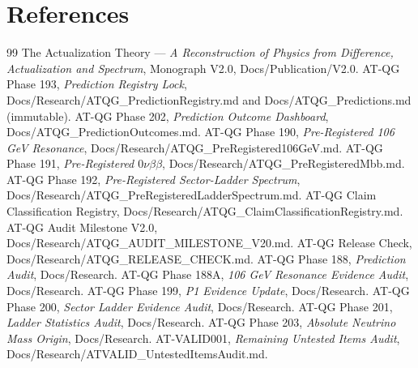 \documentclass[11pt,a4paper]{article}
\begin{document}
\section*{References}
\label{sec:references}

\begin{thebibliography}{99}
 The Actualization Theory --- \emph{A Reconstruction of Physics from
Difference, Actualization and Spectrum}, Monograph V2.0, Docs/Publication/V2.0.
 AT-QG Phase 193, \emph{Prediction Registry Lock},
Docs/Research/ATQG\_PredictionRegistry.md and Docs/ATQG\_Predictions.md (immutable).
 AT-QG Phase 202, \emph{Prediction Outcome Dashboard},
Docs/ATQG\_PredictionOutcomes.md.
 AT-QG Phase 190, \emph{Pre-Registered 106 GeV Resonance},
Docs/Research/ATQG\_PreRegistered106GeV.md.
 AT-QG Phase 191, \emph{Pre-Registered $0\nu\beta\beta$},
Docs/Research/ATQG\_PreRegisteredMbb.md.
 AT-QG Phase 192, \emph{Pre-Registered Sector-Ladder Spectrum},
Docs/Research/ATQG\_PreRegisteredLadderSpectrum.md.
 AT-QG Claim Classification Registry, Docs/Research/ATQG\_ClaimClassificationRegistry.md.
 AT-QG Audit Milestone V2.0, Docs/Research/ATQG\_AUDIT\_MILESTONE\_V20.md.
 AT-QG Release Check, Docs/Research/ATQG\_RELEASE\_CHECK.md.
 AT-QG Phase 188, \emph{Prediction Audit}, Docs/Research.
 AT-QG Phase 188A, \emph{106 GeV Resonance Evidence Audit}, Docs/Research.
 AT-QG Phase 199, \emph{P1 Evidence Update}, Docs/Research.
 AT-QG Phase 200, \emph{Sector Ladder Evidence Audit}, Docs/Research.
 AT-QG Phase 201, \emph{Ladder Statistics Audit}, Docs/Research.
 AT-QG Phase 203, \emph{Absolute Neutrino Mass Origin}, Docs/Research.
 AT-VALID001, \emph{Remaining Untested Items Audit}, Docs/Research/ATVALID\_UntestedItemsAudit.md.
\end{thebibliography}
\end{document}
